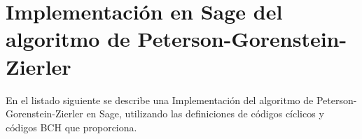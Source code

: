 \chapter[Implementación en Sage del algoritmo PGZ]{Implementación en Sage del algoritmo de Peterson-Gorenstein-Zierler}
\label{annex:pgz-sage}

En el listado siguiente se describe una Implementación del algoritmo de Peterson-Gorenstein-Zierler en Sage, utilizando las definiciones de códigos cíclicos y códigos BCH que proporciona.

